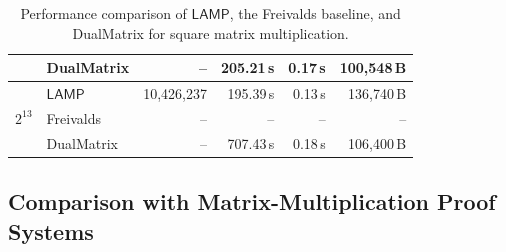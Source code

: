 \documentclass[conference,compsoc]{IEEEtran}
\newif\ifshowrevisions
\newenvironment{revblock}[1][]
  {%
    \ifshowrevisions
      \begin{tcolorbox}[
        breakable,
        colback=revisionyellow,
        colframe=revisionyellow,
        boxrule=0pt,
        arc=0pt,
        left=2pt,
        right=2pt,
        top=2pt,
        bottom=2pt,
        before skip=2pt,
        after skip=2pt,
        #1
      ]
    \fi
  }
  {%
    \ifshowrevisions
      \end{tcolorbox}
    \fi
  }
\newcommand{\protocol}{\textsf{LAMP}}   %
\theoremstyle{plain}
\theoremstyle{definition}
\theoremstyle{remark}
\begin{document}
\begin{table}[!t]
\begin{revblock}[unbreakable]
\begin{tabular*}{\linewidth}{@{\extracolsep{\fill}}clrrrr@{}}
           & DualMatrix & -- & 205.21\,s & 0.17\,s & 100{,}548\,B \\
\midrule
\multirow{3}{*}{$2^{13}$} & \(\protocol\) & 10{,}426{,}237 & 195.39\,s & 0.13\,s & 136{,}740\,B \\
           & Freivalds & -- & -- & -- & -- \\
           & DualMatrix & -- & 707.43\,s & 0.18\,s & 106{,}400\,B \\
\bottomrule
\end{tabular*}
\end{revblock}
\vspace{6pt}
\caption{Performance comparison of \(\protocol\), the Freivalds baseline, and DualMatrix for square matrix multiplication.}
\label{tab:matmul-comparison}
\end{table}


\subsection[Comparison with Matrix-Multiplication Proof Systems]
  {Comparison with Matrix-Multiplication Proof Systems}
  \label{sec:eval-matmul-comparison}
\end{document}

